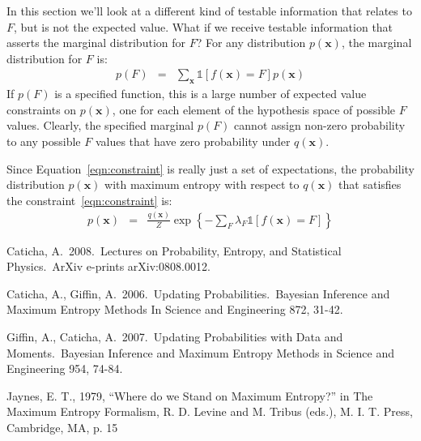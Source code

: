 \documentclass[letterpaper, 11pt]{article}
\newcommand{\xx}{\boldsymbol{x}}
\begin{document}
In this section we'll look at a different kind of testable information that
relates to $F$, but is not the expected value. What if we receive testable
information that asserts the marginal distribution for $F$?
For any distribution $p(\xx)$, the marginal distribution for $F$ is:
\begin{eqnarray}
p(F) &=& \sum_{\xx}\mathds{1}\left[f(\xx) = F\right]p(\xx)\label{eqn:constraint}
\end{eqnarray}
If $p(F)$ is a specified function, this is a large number of expected
value constraints on $p(\xx)$, one for each element of the hypothesis space
of possible $F$ values. Clearly, the specified marginal $p(F)$ cannot assign
non-zero probability to any possible $F$ values that have zero probability
under $q(\xx)$.

Since Equation~\ref{eqn:constraint} is really just a set of expectations,
the probability distribution
$p(\xx)$ with maximum entropy with respect to $q(\xx)$ that satisfies the
constraint~\ref{eqn:constraint} is:
\begin{eqnarray}
p(\xx) &=& \frac{q(\xx)}{Z}\exp\left\{-\sum_F \lambda_F \mathds{1}
\left[f(\xx) = F\right]  \right\}
\end{eqnarray}


\begin{thebibliography}{}
 Caticha, A.\ 2008.\ Lectures 
on Probability, Entropy, and Statistical Physics.\ ArXiv e-prints 
arXiv:0808.0012. 

 Caticha, A., 
Giffin, A.\ 2006.\ Updating Probabilities.\ Bayesian Inference and Maximum 
Entropy Methods In Science and Engineering 872, 31-42.

 Giffin, A., 
Caticha, A.\ 2007.\ Updating Probabilities with Data and Moments.\ Bayesian 
Inference and Maximum Entropy Methods in Science and Engineering 954, 
74-84.

 Jaynes, E. T., 1979, ``Where do we Stand on Maximum Entropy?'' in The Maximum Entropy Formalism, R. D. Levine and M. Tribus (eds.), M. I. T. Press, Cambridge, MA, p. 15
\end{thebibliography}
\end{document}
